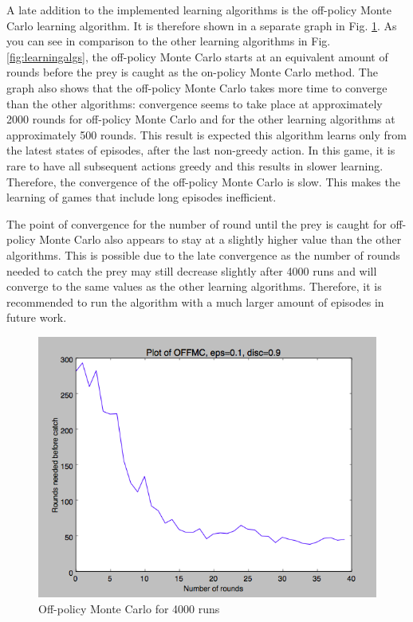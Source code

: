 \documentclass{article}
\begin{document}
A late addition to the implemented learning algorithms is the off-policy Monte Carlo learning algorithm. It is therefore shown in a separate graph in Fig. \ref{fig:offmc}. As you can see in comparison to the other learning algorithms in Fig. \ref{fig:learningalgs}, the off-policy Monte Carlo starts at an equivalent amount of rounds before the prey is caught as the on-policy Monte Carlo method. The graph also shows that the off-policy Monte Carlo takes more time to converge than the other algorithms: convergence seems to take place at approximately 2000 rounds for off-policy Monte Carlo and for the other learning algorithms at approximately 500 rounds. This result is expected this algorithm learns only from the latest states of episodes, after the last non-greedy action. In this game, it is rare to have all subsequent actions greedy and this results in slower learning. Therefore, the convergence of the off-policy Monte Carlo is slow. This makes the learning of games that include long episodes inefficient.

The point of convergence for the number of round until the prey is caught for off-policy Monte Carlo also appears to stay at a slightly higher value than the other algorithms. This is possible due to the late convergence as the number of rounds needed to catch the prey may  still decrease slightly after 4000 runs and will converge to the same values as the other learning algorithms. Therefore, it is recommended to run the algorithm with a much larger amount of episodes in future work.

\begin{figure}[H]
\begin{center}
\includegraphics[scale=0.4]{OFFMC_11x11_preyat_5x5}
\caption{Off-policy Monte Carlo for 4000 runs}
\label{fig:offmc}
\end{center}
\end{figure}
\end{document}
